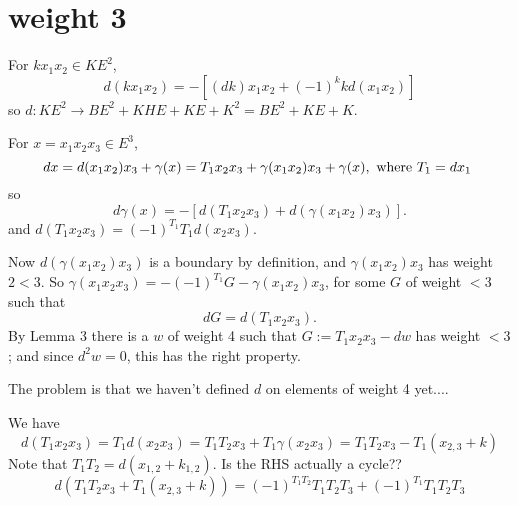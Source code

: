 \documentclass[11pt]{amsart}
\def\g{{\gamma}}
\begin{document}
\section{weight 3}
For $kx_1x_2\in KE^2$,
$$
d(kx_1x_2) = -[(dk)x_1x_2 + (-1)^k kd(x_1x_2)]
$$
so $d: KE^2 \to BE^2+KHE+KE+K^2 = BE^2+KE+K.$

For $x = x_1x_2x_3\in E^3$,
$$
dx = d(x_1x_2)x_3+\g(x) = T_1x_2x_3+\g(x_1x_2)x_3+\g(x), \hbox{ where $T_1 = dx_1$ }
$$
so
$$
d\g(x) = -[d(T_1x_2x_3)  + d(\g(x_1x_2)x_3)].
$$
and $d(T_1x_2x_3) = (-1)^{T_1}T_1d(x_2x_3)$.

Now $d(\g(x_1x_2)x_3)$ is a boundary by definition, and $\g(x_{1}x_{2})x_{3}$ has weight $2<3$. So
 $\g(x_1x_2x_3) = - (-1)^{T_{1}}G-\g(x_1x_2)x_3$, for some $G$  of weight $<3$ such that
$$
dG = d(T_1x_2x_3).
$$
By Lemma 3 there is a $w$ of weight 4 such that  $G := T_{1}x_{2}x_{3} -dw$ has weight $<3$; and
since $d^{2}w = 0$, this has the right property.

The problem is that we haven't defined $d$ on elements of weight 4 yet....


We have 
$$
d(T_1x_2x_3) = T_1d(x_2x_3) = T_1T_2x_3+T_1\g(x_{2}x_3) = T_1T_2x_3-T_1(x_{2,3}+k)
$$
Note that $T_1T_2 = d(x_{1,2}+k_{1,2})$.
Is the RHS actually a cycle??
$$
d(T_1T_2x_3+T_1(x_{2,3}+k)) = (-1)^{T_1T_2}T_1T_2T_3 + (-1)^{T_1}T_1T_2T_3 
$$
 
\end{document}

